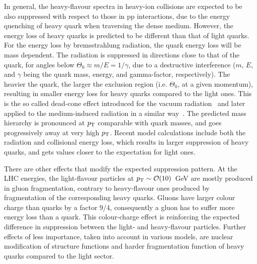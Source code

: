 In general, the heavy-flavour spectra in heavy-ion collisions are expected to be also suppressed with respect to those in pp interactions, due to the energy quenching of heavy quark when traversing the dense medium. However, the energy loss of heavy quarks is predicted to be different than that of light quarks. For the energy loss by bremsstrahlung radiation, the quark energy loss will be mass dependent. The radiation is suppressed in directions close to that of the quark, for angles below $\Theta_0 \approx m/E = 1/\gamma$, due to a destructive interference ($m$, $E$, and $\gamma$ being the quark mass, energy, and gamma-factor, respectively). The heavier the quark, the larger the exclusion region (i.e. $\Theta_0$, at a given momentum), resulting in smaller energy loss for heavy quarks compared to the light ones. This is the so called dead-cone effect introduced for the vacuum radiation~\cite{Dokshitzer:1991fc} and later applied to the medium-induced radiation in a similar way~\cite{Dokshitzer:2001zm}. The predicted mass hierarchy is pronounced at $p_{\rm T}$ comparable with quark masses, and goes progressively away at very high $p_{\rm T}$. Recent model calculations include both the radiation and collisional energy loss, which results in larger suppression of heavy quarks, and gets values closer to the expectation for light ones.

There are other effects that modify the expected suppression pattern. At the LHC energies, the light-flavour particles at $p_{\rm T} \sim {\cal O}(10)$~GeV are mostly produced in gluon fragmentation, contrary to heavy-flavour ones produced by fragmentation of the corresponding heavy quarks. Gluons have larger colour charge than quarks by a factor 9/4, consequently a gluon has to suffer more energy loss than a quark. This colour-charge effect is reinforcing the expected difference in suppression between the light- and heavy-flavour particles. Further effects of less importance, taken into account in various models, are nuclear modification of structure functions and harder fragmentation function of heavy quarks compared to the light sector.


